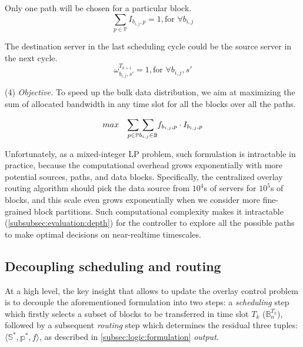 \begin{packeditemize}
\item Only one path will be chosen for a particular block.
\begin{equation}
\displaystyle{\sum_{p \in \mathbb{P}}} I_{b_{i,j},p} = 1, \text{for }\forall b_{i,j}
\end{equation}


\item The destination server in the last scheduling cycle could be the source server in the next cycle.
\begin{equation}
\omega^{T_{k+1}}_{b_{i,j},s'} = 1, \text{for }\forall b_{i,j}, s'
\end{equation}
\end{packeditemize}


\noindent(4) {\em Objective.} To speed up the bulk data distribution, we aim at maximizing the sum of allocated bandwidth in any time slot for all the blocks over all the paths.

\begin{equation}
\centering
max \quad \displaystyle{\sum_{p\in \mathbb{P}}} \displaystyle{\sum_{b_{i,j} \in \mathbb{B}}} f_{b_{i,j},p} \cdot I_{b_{i,j},p}
\label{equation:objective}
\end{equation}

Unfortunately, as a mixed-integer LP problem, such formulation is intractable in practice, because the computational overhead grows exponentially with more potential sources, paths, and data blocks. Specifically, the centralized overlay routing algorithm should pick the data source from $10^4$s of servers for $10^5$s of blocks, and this scale even grows exponentially when we consider more fine-grained block partitions. Such computational complexity makes it intractable (\Section\ref{subsubsec:evaluation:depth}) for the controller to explore all the possible paths to make optimal decisions on near-realtime timescales.


\subsection{Decoupling scheduling and routing}
\label{subsec:logic:separation}

At a high level, the key insight that allows \name to update the overlay control problem is
to decouple the aforementioned formulation into two steps:
a {\em scheduling} step which firstly selects a subset of blocks to be transferred in time slot $T_k$
($\mathbb{B}^{T_k}_n$), followed by a subsequent {\em routing}
step which determines the residual three tuples: $\langle \mathbb{S}^*, \mathbb{p}^*, f \rangle$, as described in \Section\ref{subsec:logic:formulation} {\em output}.

